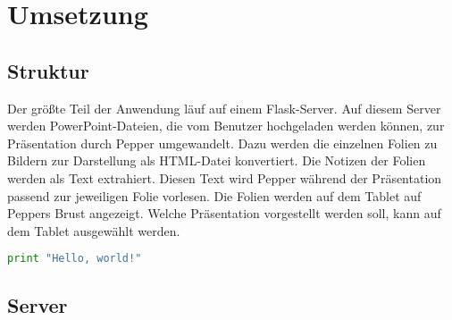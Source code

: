 \chapter{Umsetzung}\label{sec:umsetzung}

\section{Struktur}\label{sec:struktur}
Der größte Teil der Anwendung läuf auf einem Flask-Server. Auf diesem Server
werden PowerPoint-Dateien, die vom Benutzer hochgeladen werden können, zur
Präsentation durch Pepper umgewandelt. Dazu werden die einzelnen Folien zu
Bildern zur Darstellung als HTML-Datei konvertiert. Die Notizen der Folien
werden als Text extrahiert. Diesen Text wird Pepper während der Präsentation
passend zur jeweiligen Folie vorlesen. Die Folien werden auf dem Tablet auf
Peppers Brust angezeigt. Welche Präsentation vorgestellt werden soll, kann auf
dem Tablet ausgewählt werden.

\begin{lstlisting}[float, language=Python, frame=single, framexleftmargin=15pt,
style=algoBericht, label={lst:vorlage}, captionpos=b, caption={Vorlage für das
Einfügen von Code-Beispielen}]
print "Hello, world!"
\end{lstlisting}

\section{Server}\label{sec:server}
